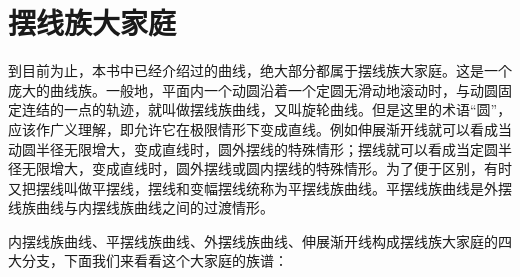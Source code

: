 \section{摆线族大家庭}

到目前为止，本书中已经介绍过的曲线，绝大部分都属于摆线族大家庭。这是一个庞大的曲线族。一般地，平面内一个动圆沿着一个定圆无滑动地滚动时，与动圆固定连结的一点的轨迹，就叫做摆线族曲线，又叫旋轮曲线。但是这里的术语“圆”，应该作广义理解，即允许它在极限情形下变成直线。例如伸展渐开线就可以看成当动圆半径无限增大，变成直线时，圆外摆线的特殊情形；摆线就可以看成当定圆半径无限增大，变成直线时，圆外摆线或圆内摆线的特殊情形。为了便于区别，有时又把摆线叫做平摆线，摆线和变幅摆线统称为平摆线族曲线。平摆线族曲线是外摆线族曲线与内摆线族曲线之间的过渡情形。

内摆线族曲线、平摆线族曲线、外摆线族曲线、伸展渐开线构成摆线族大家庭的四大分支，下面我们来看看这个大家庭的族谱：

